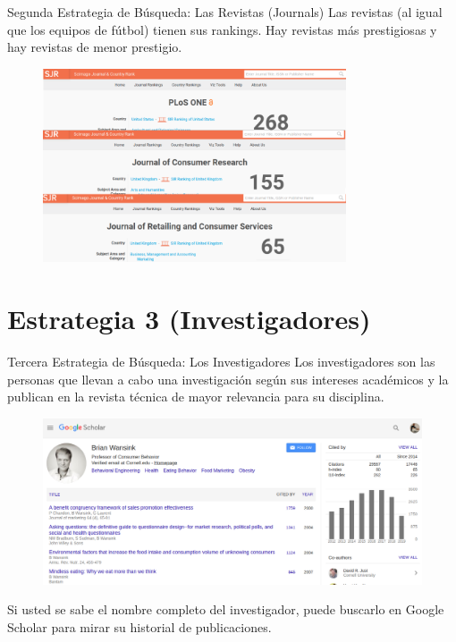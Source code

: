 \documentclass[9pt]{beamer}
\begin{document}
\begin{frame}{Segunda Estrategia de Búsqueda: Las Revistas (Journals)}
Las revistas (al igual que los equipos de fútbol) tienen sus rankings. Hay revistas más prestigiosas y hay revistas de menor prestigio.
\begin{figure}
\centering
 \includegraphics[width=0.8\textwidth]{b11}
\end{figure}
\end{frame}



\section{Estrategia 3 (Investigadores)}
\begin{frame}{Tercera Estrategia de Búsqueda: Los Investigadores}
Los investigadores son las personas que llevan a cabo una investigación según sus intereses académicos y la publican en la revista técnica de mayor relevancia para su disciplina.
\begin{figure}
\centering
 \includegraphics[width=1\textwidth]{b9}
\end{figure}
Si usted se sabe el nombre completo del investigador, puede buscarlo en Google Scholar para mirar su historial de publicaciones. 
\end{frame}
\end{document}
